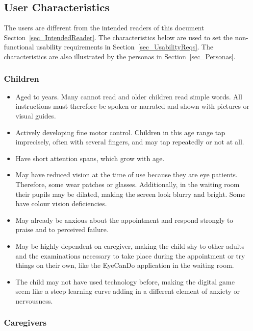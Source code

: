 \documentclass[12pt]{article}
\newcommand{\constref}[1]{%
    \hyperref[const:#1]{\texttt{\detokenize{#1}}}%
}
\begin{document}
\subsection{User Characteristics} \label{SecUserCharacteristics}

The users are different from the intended readers of this document Section~\ref{sec_IntendedReader}. 
The characteristics below are used to set the non-functional usability requirements in 
Section~\ref{sec_UsabilityReqs}. The characteristics are also illustrated by the personas in 
Section~\ref{sec_Personas}.

\subsubsection*{\textbf{Children}}

\begin{itemize}
    \item Aged \constref{MIN_AGE} to \constref{MAX_AGE} years. Many cannot read and older children 
    read simple words. All instructions must therefore be spoken or narrated and shown with pictures
    or visual guides.
    \item Actively developing fine motor control. Children in this age range tap imprecisely, often 
    with several fingers, and may tap repeatedly or not at all.
    \item Have short attention spans, which grow with age.
    \item May have reduced vision at the time of use because they are eye patients. Therefore, some 
    wear patches or glasses. Additionally, in the waiting room their pupils may be dilated, 
    making the screen look blurry and bright. Some have colour vision deficiencies.
    \item May already be anxious about the appointment and respond strongly to praise and 
    to perceived failure.
    \item May be highly dependent on caregiver, making the child shy to other adults and the 
    examinations necessary to take place during the appointment or try things on their own, like 
    the EyeCanDo application in the waiting room.
    \item The child may not have used technology before, making the digital game seem like a steep 
    learning curve adding in a different element of anxiety or nervousness.
\end{itemize}

\subsubsection*{\textbf{Caregivers}}
\end{document}
